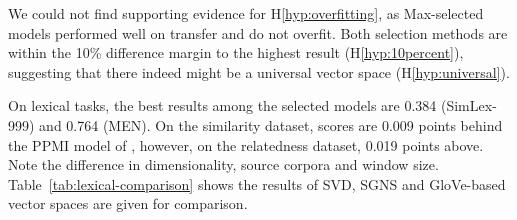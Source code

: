 We could not find supporting evidence for H\ref{hyp:overfitting}, as Max-selected models performed well on transfer and do not overfit. Both selection methods are within the 10\% difference margin to the highest result (H\ref{hyp:10percent}), suggesting that there indeed might be a universal vector space (H\ref{hyp:universal}).


On lexical tasks, the best results among the selected models are 0.384 (SimLex-999) and 0.764 (MEN). On the similarity dataset, scores are 0.009 points behind the PPMI model of , however, on the relatedness dataset, 0.019 points above. Note the difference in dimensionality, source corpora and window size. Table~\ref{tab:lexical-comparison} shows the results of SVD, SGNS and GloVe-based vector spaces are given for comparison.


